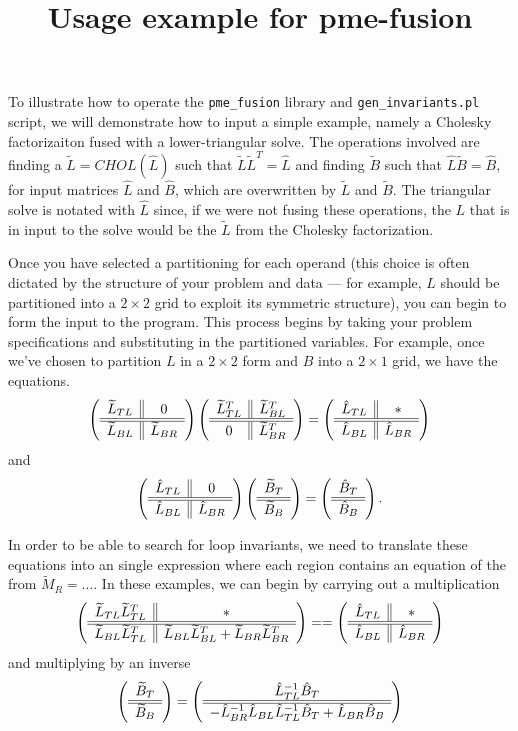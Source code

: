 \documentclass[12pt,letterpaper]{article}
\title{Usage example for pme-fusion}
\author{}
\date{}
\begin{document}
\maketitle{}

To illustrate how to operate the \texttt{pme\_fusion} library and \texttt{gen\_invariants.pl} script, we will demonstrate how to input a simple example, namely a Cholesky factorizaiton fused with a lower-triangular solve.
The operations involved are finding a $\widetilde{L} = CHOL(\hat{L})$ such that $\widetilde{L}\widetilde{L}^T = \hat{L}$ and finding $\widetilde{B}$ such that $\hat{L}\widetilde{B} = \hat{B}$, for input matrices $\hat{L}$ and $\hat{B}$, which are overwritten by $\widetilde{L}$ and $\widetilde{B}$.
The triangular solve is notated with $\hat{L}$ since, if we were not fusing these operations, the $L$ that is in input to the solve would be the $\widetilde{L}$ from the Cholesky factorization.

Once you have selected a partitioning for each operand (this choice is often dictated by the structure of your problem and data --- for example, $L$ should be partitioned into a $2 \times 2$ grid to exploit its symmetric structure), you can begin to form the input to the program.
This process begins by taking your problem specifications and substituting in the partitioned variables.
For example, once we've chosen to partition $L$ in a $2 \times 2$ form and $B$ into a $2 \times 1$ grid, we have the equations.
\begin{equation*}
  \left( \begin{array}{c || c} \widetilde{L}_{TL} & 0 \\ \hline \hline \widetilde{L}_{BL} & \widetilde{L}_{BR} \end{array} \right)
  \left( \begin{array}{c || c} \widetilde{L}^T_{TL} & \widetilde{L}^T_{BL} \\ \hline \hline 0 & \widetilde{L}^T_{BR} \end{array} \right)
  = \left( \begin{array}{c || c} \hat{L}_{TL} & * \\ \hline \hline \hat{L}_{BL} & \hat{L}_{BR} \end{array} \right)
\end{equation*}
and
\begin{equation*}
  \left( \begin{array}{c || c} \hat{L}_{TL} & 0 \\ \hline \hline \hat{L}_{BL} & \hat{L}_{BR} \end{array} \right)
  \left( \begin{array}{c} \widetilde{B}_T \\ \hline \hline \widetilde{B}_B \end{array} \right) = \left( \begin{array}{c} \hat{B}_T \\ \hline \hline \hat{B}_B \end{array} \right).
\end{equation*}

In order to be able to search for loop invariants, we need to translate these equations into an single expression where each region contains an equation of the from $\widetilde{M}_{R} = \ldots$.
In these examples, we can begin by carrying out a multiplication
\begin{equation*}
  \left( \begin{array}{c || c} \widetilde{L}_{TL}\widetilde{L}_{TL}^T & * \\ \hline \hline \widetilde{L}_{BL}\widetilde{L}_{TL}^T & \widetilde{L}_{BL}\widetilde{L}_{BL}^T + \widetilde{L}_{BR}\widetilde{L}_{BR}^T \end{array} \right)
  = = \left( \begin{array}{c || c} \hat{L}_{TL} & * \\ \hline \hline \hat{L}_{BL} & \hat{L}_{BR} \end{array} \right)
\end{equation*}
and multiplying by an inverse
\begin{equation*}
  \left( \begin{array}{c} \widetilde{B}_{T} \\ \hline \hline \widetilde{B}_B \end{array} \right)
  = \left( \begin{array}{c} \hat{L}_{TL}^{-1}\hat{B}_T \\ \hline \hline -\hat{L}_{BR}^{-1}\hat{L}_{BL}\hat{L}_{TL}^{-1}\hat{B}_T + \hat{L}_{BR}\hat{B}_B \end{array} \right)
\end{equation*}
\end{document}
